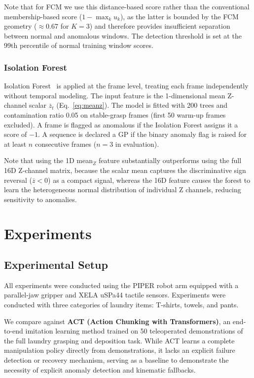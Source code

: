 \documentclass[pdflatex,sn-mathphys-num]{sn-jnl}%
\theoremstyle{thmstyleone}%
\theoremstyle{thmstyletwo}%
\theoremstyle{thmstylethree}%
\begin{document}
Note that for FCM we use this distance-based score rather than the conventional membership-based score ($1 - \max_k u_k$), as the latter is bounded by the FCM geometry ($\approx 0.67$ for $K=3$) and therefore provides insufficient separation between normal and anomalous windows. The detection threshold is set at the 99th percentile of normal training window scores.

\subsubsection{Isolation Forest}
\label{sec:iforest}

Isolation Forest~\cite{Liu2008} is applied at the frame level, treating each frame independently without temporal modeling. The input feature is the 1-dimensional mean Z-channel scalar $\overline{z}_t$ (Eq.~\eqref{eq:meanz}). The model is fitted with 200 trees and contamination ratio 0.05 on stable-grasp frames (first 50 warm-up frames excluded). A frame is flagged as anomalous if the Isolation Forest assigns it a score of $-1$. A sequence is declared a GP if the binary anomaly flag is raised for at least $n$ consecutive frames ($n = 3$ in evaluation).

Note that using the 1D mean$_Z$ feature substantially outperforms using the full 16D Z-channel matrix, because the scalar mean captures the discriminative sign reversal ($\overline{z} < 0$) as a compact signal, whereas the 16D feature causes the forest to learn the heterogeneous normal distribution of individual Z channels, reducing sensitivity to anomalies.

\section{Experiments}
\label{sec:experiments}
\subsection{Experimental Setup}
All experiments were conducted using the PIPER robot arm equipped with a parallel-jaw gripper and XELA uSPa44 tactile sensors. Experiments were conducted with three categories of laundry items: T-shirts, towels, and pants.

We compare against \textbf{ACT (Action Chunking with Transformers)}, an end-to-end imitation learning method trained on 50 teleoperated demonstrations of the full laundry grasping and deposition task. While ACT learns a complete manipulation policy directly from demonstrations, it lacks an explicit failure detection or recovery mechanism, serving as a baseline to demonstrate the necessity of explicit anomaly detection and kinematic fallbacks.
\end{document}
